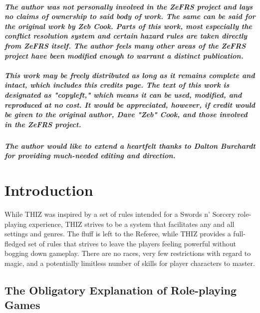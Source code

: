 \documentclass[oneside]{book}
\begin{document}
\paragraph{The author was not personally involved in the ZeFRS project and lays no claims of ownership to said body of work. The same can be said for the original work by Zeb Cook. Parts of this work, most especially the conflict resolution system and certain hazard rules are taken directly from ZeFRS itself. The author feels many other areas of the ZeFRS project have been modified enough to warrant a distinct publication. \\ \\
This work may be freely distributed as long as it remains complete and intact, which includes this credits page. The text of this work is designated as "copyleft," which means it can be used, modified, and reproduced at no cost. It would be appreciated, however, if credit would be given to the original author, Dave "Zeb" Cook, and those involved in the ZeFRS project.}

\paragraph{The author would like to extend a heartfelt thanks to Dalton Burchardt for providing much-needed editing and direction.}

\tableofcontents

\chapter{Introduction}

While THIZ was inspired by a set of rules intended for a Swords n' Sorcery role-playing experience, THIZ strives to be a system that facilitates any and all settings and genres. The fluff is left to the Referee, while THIZ provides a full-fledged set of rules that strives to leave the players feeling powerful without bogging down gameplay. There are no races, very few restrictions with regard to magic, and a potentially limitless number of skills for player characters to master. 

\section*{The Obligatory Explanation of Role-playing Games}
\end{document}
